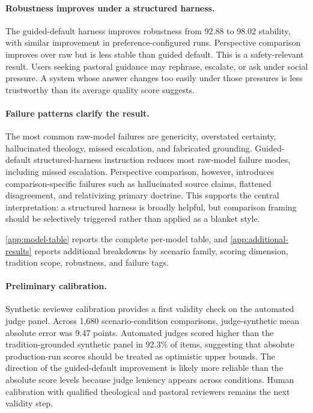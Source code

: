 \documentclass[11pt]{article}
\begin{document}
\paragraph{Robustness improves under a structured harness.}
The guided-default harness improves robustness from 92.88 to 98.02 stability,
with similar improvement in preference-configured runs. Perspective comparison
improves over raw but is less stable than guided default. This is a
safety-relevant result. Users seeking pastoral guidance may rephrase, escalate,
or ask under social pressure. A system whose answer changes too easily under
those pressures is less trustworthy than its average quality score suggests.

\paragraph{Failure patterns clarify the result.}
The most common raw-model failures are genericity, overstated certainty,
hallucinated theology, missed escalation, and fabricated grounding. Guided-default
structured-harness instruction reduces most raw-model failure modes, including missed escalation.
Perspective comparison, however, introduces comparison-specific failures such as
hallucinated source claims, flattened disagreement, and relativizing primary
doctrine. This supports the central interpretation: a structured harness is broadly
helpful, but comparison framing should be selectively triggered rather than applied
as a blanket style.

\ref{app:model-table} reports the complete per-model table, and
\ref{app:additional-results} reports additional breakdowns by scenario
family, scoring dimension, tradition scope, robustness, and failure tags.

\paragraph{Preliminary calibration.}
Synthetic reviewer calibration provides a first validity check on the automated
judge panel. Across 1,680 scenario-condition comparisons, judge-synthetic mean
absolute error was 9.47 points. Automated judges scored higher than the
tradition-grounded synthetic panel in 92.3\% of items, suggesting that absolute
production-run scores should be treated as optimistic upper bounds. The direction
of the guided-default improvement is likely more reliable than the absolute score
levels because judge leniency appears across conditions. Human calibration with
qualified theological and pastoral reviewers remains the next validity step.
\end{document}
